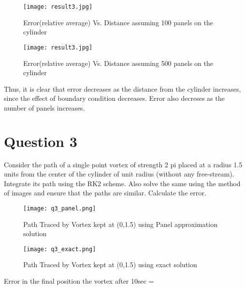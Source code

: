 \documentclass{article}
\begin{document}
\begin{figure}[H]  \label{figure}
\texttt{[image: result3.jpg]}
\caption{Error(relative average) Vs. Distance assuming 100 panels on the cylinder}
\label{figure:}
\end{figure}

\begin{figure}[H]  \label{figure}
\texttt{[image: result3.jpg]}
\caption{Error(relative average) Vs. Distance assuming 500 panels on the cylinder}
\label{figure:}
\end{figure}

Thus, it is clear that error decreases as the distance from the cylinder increases, since the effect of boundary condition decreases.
Error also decreses as the number of panels increases. 

\section*{Question 3}
Consider the path of a single point vortex of strength 2 pi placed at a radius 1.5 units from the center of the cylinder of unit radius (without any free-stream). Integrate its path using the RK2 scheme. Also solve the same using the method of images and ensure that the paths are similar. Calculate the error.
\begin{figure}[H] \label{figure}
\texttt{[image: q3\_panel.png]}
\caption{Path Traced by Vortex kept at (0,1.5) using Panel approximation solution}
\label{figure:}
\end{figure}

\begin{figure}[H]  \label{figure}
\texttt{[image: q3\_exact.png]}
\caption{Path Traced by Vortex kept at (0,1.5) using exact solution}
\label{figure:}
\end{figure}

Error in the final position the vortex after 10sec =  
  
\end{document}
